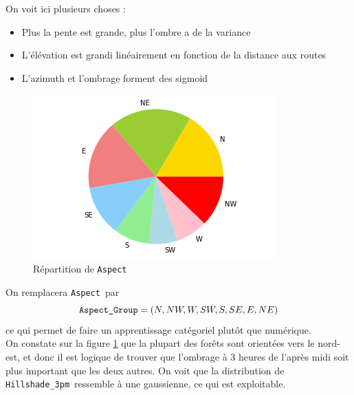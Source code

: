 \documentclass[12pt,a4paper]{article}
\numberwithin{equation}{section}
\newcommand{\aspect}{\texttt{Aspect}}
\newcommand{\hilshadeA}{\texttt{Hillshade\_3pm}}
\begin{document}
	On voit ici plusieurs choses :
	
	\begin{itemize}
		\item Plus la pente est grande, plus l'ombre a de la variance
		\item L'élévation est grandi linéairement en fonction de la distance aux routes
		\item L'azimuth et l'ombrage forment des sigmoid\\
	\end{itemize}
	
	\begin{figure}
		\centering
		\includegraphics[width=.9\linewidth]{img/aspect}
		\caption{Répartition de \aspect }
		\label{Aspect}
	\end{figure}
	
	On remplacera \aspect \ par $$\verb!Aspect_Group! = (N,NW,W,SW,S,SE,E,NE)$$ ce qui permet de faire un apprentissage catégoriel plutôt que numérique.\\
	
	On constate sur la figure \ref{Aspect} que la plupart des forêts sont orientées vers le nord-est, et donc il est logique de trouver que l'ombrage à 3 heures de l'après midi soit plus important que les deux autres. On voit que la distribution de \hilshadeA \ ressemble à une gaussienne, ce qui est exploitable. 
	
\end{document}
